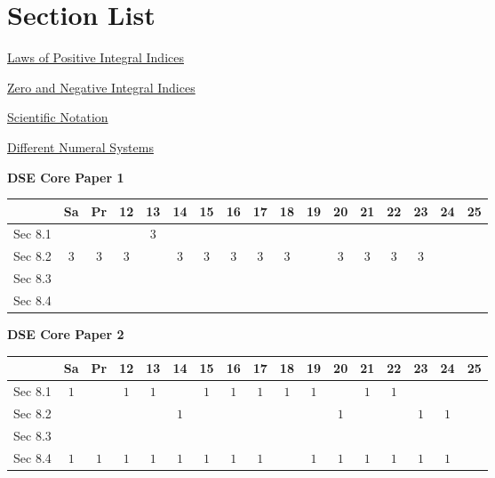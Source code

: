 \documentclass[12pt, a4paper]{article}
\begin{document}
\section*{Section List}
\begin{enumx}[label=Sec 8.\arabic*\ ]
\item \hyperref[section:2-8-1]{Laws of Positive Integral Indices}
\item \hyperref[section:2-8-2]{Zero and Negative Integral Indices}
\item \hyperref[section:2-8-3]{Scientific Notation}
\item \hyperref[section:2-8-4]{Different Numeral Systems \NF}
\end{enumx}
\begin{absolutelynopagebreak}
\begin{center}
\textbf{DSE Core Paper 1}
\end{center}
\begin{center}
\begin{tabular}{|l|c|c|c|c|c|c|c|c|c|c|c|c|c|c|c|c|}
\hline
        & Sa & Pr & 12 & 13 & 14 & 15 & 16 & 17 & 18 & 19 & 20 & 21 & 22 & 23 & 24 & 25 \\\hline\hline
Sec 8.1 &  &  &  &  $3$ &  &  &  &  &  &  &  &  &  &  &  &  \\\hline
Sec 8.2 &  $3$ &  $3$ &  $3$ &  &  $3$ &  $3$ &  $3$ &  $3$ &  $3$ &  &  $3$ &  $3$ &  $3$ &  $3$ &  &  \\\hline
Sec 8.3 &  &  &  &  &  &  &  &  &  &  &  &  &  &  &  &  \\\hline
Sec 8.4 &  &  &  &  &  &  &  &  &  &  &  &  &  &  &  &  \\\hline
\end{tabular}
\end{center}
\end{absolutelynopagebreak}
\begin{absolutelynopagebreak}
\begin{center}
\textbf{DSE Core Paper 2}
\end{center}
\begin{center}
\begin{tabular}{|l|c|c|c|c|c|c|c|c|c|c|c|c|c|c|c|c|}
\hline
        & Sa & Pr & 12 & 13 & 14 & 15 & 16 & 17 & 18 & 19 & 20 & 21 & 22 & 23 & 24 & 25 \\\hline\hline
Sec 8.1 &  $1$ &  &  $1$ &  $1$ &  &  $1$ &  $1$ &  $1$ &  $1$ &  $1$ &  &  $1$ &  $1$ &  &  &  \\\hline
Sec 8.2 &  &  &  &  &  $1$ &  &  &  &  &  &  $1$ &  &  &  $1$ &  $1$ &  \\\hline
Sec 8.3 &  &  &  &  &  &  &  &  &  &  &  &  &  &  &  &  \\\hline
Sec 8.4 &  $1$ &  $1$ &  $1$ &  $1$ &  $1$ &  $1$ &  $1$ &  $1$ &  &  $1$ &  $1$ &  $1$ &  $1$ &  $1$ &  $1$ &  \\\hline
\end{tabular}
\end{center}
\end{absolutelynopagebreak}
\end{document}
